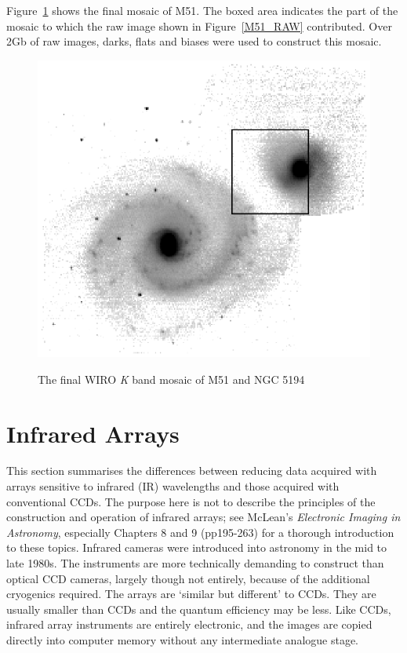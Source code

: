 \documentclass[twoside,11pt]{article}
\newcommand{\xlabel}[1]{}
\begin{document}
Figure~\ref{M51_MOSAIC} shows the final mosaic of M51.  The boxed
area indicates the part of the mosaic to which the raw image shown
in Figure~\ref{M51_RAW} contributed.  Over 2Gb of raw images, darks,
flats and biases were used to construct this mosaic.

\begin{figure}[htbp]
   \centering 
   \includegraphics[totalheight=4in]{sc5_m51_mosaic.ps}
   \begin{quote}
   \caption{The final WIRO {\it K}\/ band mosaic of M51 and NGC 5194
   \label{M51_MOSAIC} }
   \end{quote}
\end{figure}


\section{\xlabel{IR}\label{IR}Infrared Arrays}

This section summarises the differences between reducing data acquired
with arrays sensitive to infrared (IR) wavelengths and those acquired
with conventional CCDs.  The purpose here is not to describe the principles
of the construction and operation of infrared arrays; see McLean's {\it
Electronic Imaging in Astronomy}\/\cite{MCLEAN97}, especially Chapters 8
and 9 (pp195-263) for a thorough introduction to these topics.  Infrared
cameras were introduced into astronomy in the mid to late 1980s.  The
instruments are more technically demanding to construct than optical
CCD cameras, largely though not entirely, because of the additional
cryogenics required.  The arrays are `similar but different' to CCDs.
They are usually smaller than CCDs and the quantum efficiency may be less.
Like CCDs, infrared array instruments are entirely electronic, and the
images are copied directly into computer memory without any intermediate
analogue stage.
\end{document}
